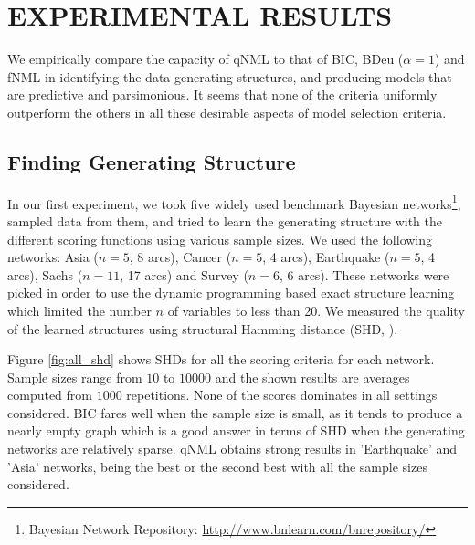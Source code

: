 \section{EXPERIMENTAL RESULTS}

We empirically compare the capacity of qNML to that of BIC, BDeu ($\alpha = 1$) and
fNML in identifying the data generating structures, and producing
models that are predictive and parsimonious.  It seems that none of
the criteria uniformly outperform the others in all these desirable
aspects of model selection criteria.

\subsection{Finding Generating Structure}

In our first experiment, we took five widely used benchmark Bayesian networks\footnote{Bayesian Network Repository: \url{http://www.bnlearn.com/bnrepository/}}, sampled data from them, and tried to learn the generating structure with the different scoring functions using various sample sizes. We used the following networks: Asia ($n=5$, 8 arcs), Cancer ($n=5$, 4 arcs), Earthquake ($n=5$, 4 arcs), Sachs ($n=11$, 17 arcs) and Survey ($n=6$, 6 arcs). These networks were picked in order to use the dynamic programming based exact structure learning~\cite{cosco.uai06} which limited the number $n$ of variables
to less than 20. We measured the quality of the learned structures using structural Hamming distance (SHD, \cite{Tsamardinos2006}). 

Figure \ref{fig:all_shd} shows SHDs for all the scoring criteria for each network. Sample sizes range from $10$ to $10000$ and the shown results are averages computed from $1000$ repetitions. None of the scores dominates in all settings considered. BIC fares well when the sample size is small, as it tends to produce a nearly empty graph which is a good answer in terms of SHD when the generating networks are relatively sparse. qNML obtains strong results in 'Earthquake' and 'Asia' networks, being the best or the second best with all the sample sizes considered.

